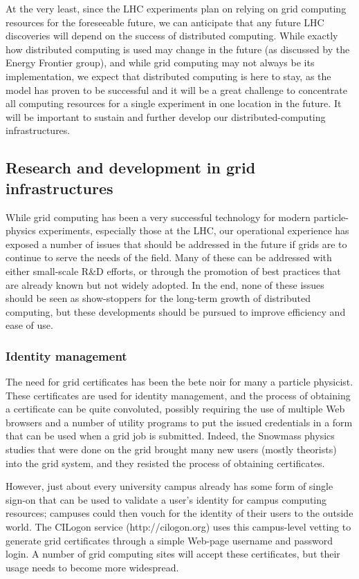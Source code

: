 At the very least, since the LHC experiments plan on relying on grid computing resources for the foreseeable future, we can anticipate that any future LHC discoveries will depend on the success of distributed computing.  While exactly how distributed computing is used may change in the future (as discussed by the Energy Frontier group), and while grid computing may not always be its implementation, we expect that distributed computing is here to stay, as the model has proven to be successful and it will be a great challenge to concentrate all computing resources for a single experiment in one location in the future.  It will be important to sustain and further develop our distributed-computing infrastructures.

\subsection{Research and development in grid infrastructures}

While grid computing has been a very successful technology for modern particle-physics experiments, especially those at the LHC, our operational experience has exposed a number of issues that should be addressed in the future if grids are to continue to serve the needs of the field.  Many of these can be addressed with either small-scale R\&D efforts, or through the promotion of best practices that are already known but not widely adopted.  In the end, none of these issues should be seen as show-stoppers for the long-term growth of distributed computing, but these developments should be pursued to improve efficiency and ease of use.

\subsubsection{Identity management}

The need for grid certificates has been the bete noir for many a particle physicist.  These certificates are used for identity management, and the process of obtaining a certificate can be quite convoluted, possibly requiring the use of multiple Web browsers and a number of utility programs to put the issued credentials in a form that can be used when a grid job is submitted.  Indeed, the Snowmass physics studies that were done on the grid brought many new users (mostly theorists) into the grid system, and they resisted the process of obtaining certificates.

However, just about every university campus already has some form of single sign-on that can be used to validate a user’s identity for campus computing resources; campuses could then vouch for the identity of their users to the outside world.  The CILogon service (http://cilogon.org) uses this campus-level vetting to generate grid certificates through a simple Web-page username and password login.  A number of grid computing sites will accept these certificates, but their usage needs to become more widespread.

